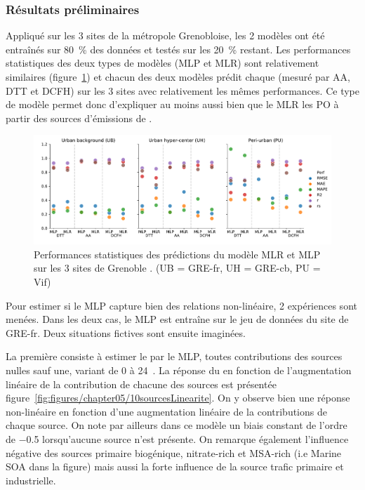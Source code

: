 \subsubsection{Résultats préliminaires}%
\label{ssub:résultats_préliminaires}

Appliqué sur les 3 sites de la métropole Grenobloise, les 2 modèles ont été entraînés sur
\SI{80}{\percent} des données et testés sur les \SI{20}{\percent} restant. Les performances
statistiques des deux types de modèles (MLP et MLR) sont relativement
similaires (figure~\ref{fig:perfMLPMLR}) et chacun des deux modèles prédit chaque \POv{}
(mesuré par AA, DTT et DCFH) sur les 3 sites avec relativement les mêmes performances.
Ce type de modèle permet donc d'expliquer au moins aussi bien que le MLR les PO à partir
des sources d'émissions de \PMdix.

\begin{figure}[ht]
    \centering
    \includegraphics[width=1.0\linewidth]{figures/chapter05/perfMLPMLR.pdf}
    \caption{Performances statistiques des prédictions du modèle MLR et MLP sur les 3
    sites de Grenoble \autocite{borlazaUrbaninprep.}. (UB = GRE-fr, UH = GRE-cb, PU = Vif)}%
    \label{fig:perfMLPMLR}
\end{figure}

Pour estimer si le MLP capture bien des relations non-linéaire, 2 expériences sont menées.
Dans les deux cas, le MLP est entraîne sur le jeu de données du site de GRE-fr. Deux
situations fictives sont ensuite imaginées.

La première consiste à estimer le \PODTTv{} par le MLP, toutes contributions des sources
nulles sauf une, variant de 0 à 24~\si{\ugm}. La réponse du \PODTTv{} en fonction de
l'augmentation linéaire de la contribution de chacune des sources est présentée
figure~\ref{fig:figures/chapter05/10sourcesLinearite}. On y observe bien une réponse
non-linéaire en fonction d'une augmentation linéaire de la contributions de
chaque source. On note par ailleurs dans ce modèle un biais constant de l'ordre de
\SI{-0.5}{\opv} lorsqu'aucune source n'est présente.
On remarque également l'influence négative des sources primaire biogénique, nitrate-rich
et MSA-rich (i.e Marine SOA dans la figure) mais aussi la forte influence de la source
trafic primaire et industrielle.


